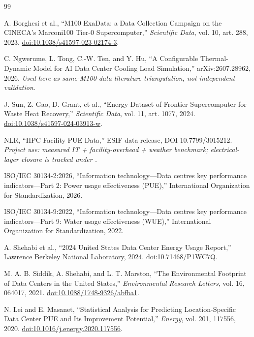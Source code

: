 \documentclass[11pt]{article}
\begin{document}
\begin{thebibliography}{99}\small

A. Borghesi et al.,
``M100 ExaData: a Data Collection Campaign on the CINECA's Marconi100 Tier-0 Supercomputer,''
\emph{Scientific Data}, vol. 10, art. 288, 2023.
\href{https://doi.org/10.1038/s41597-023-02174-3}{doi:10.1038/s41597-023-02174-3}.

C. Ngwerume, L. Tong, C.-W. Ten, and Y. Hu,
``A Configurable Thermal-Dynamic Model for AI Data Center Cooling Load Simulation,''
arXiv:2607.28962, 2026.
\textit{Used here as same-M100-data literature triangulation, not independent validation.}

J. Sun, Z. Gao, D. Grant, et al.,
``Energy Dataset of Frontier Supercomputer for Waste Heat Recovery,''
\emph{Scientific Data}, vol. 11, art. 1077, 2024.
\href{https://doi.org/10.1038/s41597-024-03913-w}{doi:10.1038/s41597-024-03913-w}.

NLR,
``HPC Facility PUE Data,''
ESIF data release, DOI 10.7799/3015212.
\textit{Project use: measured IT + facility-overhead + weather benchmark; electrical-layer closure is tracked under .}

ISO/IEC 30134-2:2026,
``Information technology---Data centres key performance indicators---Part 2: Power usage effectiveness (PUE),''
International Organization for Standardization, 2026.

ISO/IEC 30134-9:2022,
``Information technology---Data centres key performance indicators---Part 9: Water usage effectiveness (WUE),''
International Organization for Standardization, 2022.

A. Shehabi et al.,
``2024 United States Data Center Energy Usage Report,''
Lawrence Berkeley National Laboratory, 2024.
\href{https://doi.org/10.71468/P1WC7Q}{doi:10.71468/P1WC7Q}.

M. A. B. Siddik, A. Shehabi, and L. T. Marston,
``The Environmental Footprint of Data Centers in the United States,''
\emph{Environmental Research Letters}, vol. 16, 064017, 2021.
\href{https://doi.org/10.1088/1748-9326/abfba1}{doi:10.1088/1748-9326/abfba1}.

N. Lei and E. Masanet,
``Statistical Analysis for Predicting Location-Specific Data Center PUE and Its Improvement Potential,''
\emph{Energy}, vol. 201, 117556, 2020.
\href{https://doi.org/10.1016/j.energy.2020.117556}{doi:10.1016/j.energy.2020.117556}.


\end{thebibliography}
\end{document}
